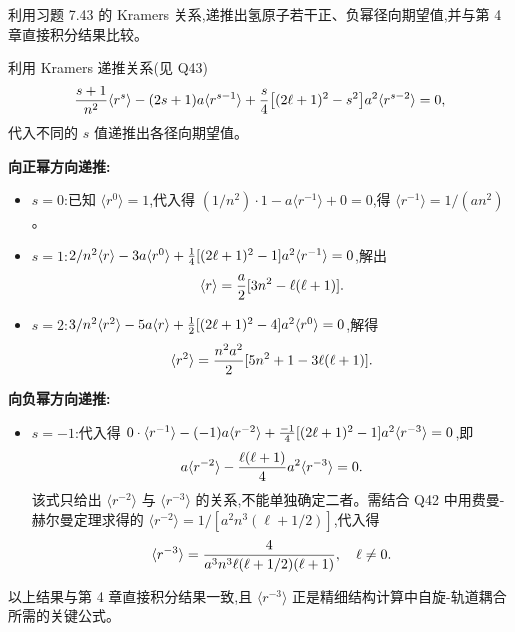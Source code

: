 \begin{question}
利用习题 7.43 的 Kramers 关系,递推出氢原子若干正、负幂径向期望值,并与第 4 章直接积分结果比较。
\end{question}
\begin{solution}
利用 Kramers 递推关系(见 Q43)
\[
{s+1\over n^2}\langle r^s\rangle - (2s+1)a\langle r^{s-1}\rangle + {s\over4}\bigl[(2\ell+1)^2-s^2\bigr]a^2\langle r^{s-2}\rangle = 0,
\]
代入不同的 $s$ 值递推出各径向期望值。

\textbf{向正幂方向递推:}
\begin{itemize}
\item $s=0$:已知 $\langle r^0\rangle=1$,代入得 $(1/n^2)\cdot1 - a\langle r^{-1}\rangle + 0=0$,得 $\langle r^{-1}\rangle=1/(an^2)$。
\item $s=1$:$2/n^2\langle r\rangle - 3a\langle r^0\rangle + {1\over4}[(2\ell+1)^2-1]a^2\langle r^{-1}\rangle = 0$,解出
  \[
  \langle r\rangle = {a\over2}[3n^2 - \ell(\ell+1)].
  \]
\item $s=2$:$3/n^2\langle r^2\rangle - 5a\langle r\rangle + {1\over2}[(2\ell+1)^2-4]a^2\langle r^0\rangle=0$,解得
  \[
  \langle r^2\rangle = {n^2a^2\over2}[5n^2+1-3\ell(\ell+1)].
  \]
\end{itemize}

\textbf{向负幂方向递推:}
\begin{itemize}
\item $s=-1$:代入得 $0\cdot\langle r^{-1}\rangle - (-1)a\langle r^{-2}\rangle + {-1\over4}[(2\ell+1)^2-1]a^2\langle r^{-3}\rangle=0$,即
  \[
  a\langle r^{-2}\rangle - {\ell(\ell+1)\over4}a^2\langle r^{-3}\rangle = 0.
  \]
  该式只给出 $\langle r^{-2}\rangle$ 与 $\langle r^{-3}\rangle$ 的关系,不能单独确定二者。需结合 Q42 中用费曼-赫尔曼定理求得的 $\langle r^{-2}\rangle=1/[a^2n^3(\ell+1/2)]$,代入得
  \[
  \langle r^{-3}\rangle = {4\over a^3 n^3\ell(\ell+1/2)(\ell+1)},\quad \ell\ne0.
  \]
\end{itemize}
以上结果与第 4 章直接积分结果一致,且 $\langle r^{-3}\rangle$ 正是精细结构计算中自旋-轨道耦合所需的关键公式。
\end{solution}

